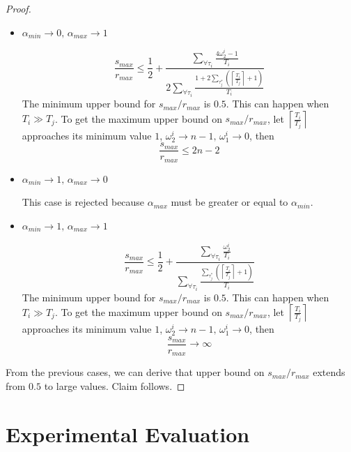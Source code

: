 \begin{proof}
\begin{itemize}
\item $\alpha_{min}\rightarrow0,\,\alpha_{max}\rightarrow1$


\begin{equation}
\frac{s_{max}}{r_{max}}\le\frac{1}{2}+\frac{\sum_{\forall\tau_{i}}\frac{4\omega_{2}^{i}-1}{T_{i}}}{2\sum_{\forall\tau_{i}}\frac{1+2\sum_{\tau_{j}^{*}}\left(\left\lceil \frac{T_{i}}{T_{j}}\right\rceil +1\right)}{T_{i}}}\label{eq:lcm rma lock-free comparison 4}
\end{equation}
The minimum upper bound for $s_{max}/r_{max}$ is $0.5$. This can
happen when $T_{i}\gg T_{j}$. To get the maximum upper bound on $s_{max}/r_{max}$,
let $\left\lceil \frac{T_{i}}{T_{j}}\right\rceil $ approaches its
minimum value $1$, $\omega_{2}^{i}\rightarrow n-1,\,\omega_{1}^{i}\rightarrow0$,
then 
\[
\frac{s_{max}}{r_{max}}\le2n-2
\]


\item $\alpha_{min}\rightarrow1,\,\alpha_{max}\rightarrow0$


This case is rejected because $\alpha_{max}$ must be greater or equal
to $\alpha_{min}$.

\item $\alpha_{min}\rightarrow1,\,\alpha_{max}\rightarrow1$


\begin{equation}
\frac{s_{max}}{r_{max}}\le\frac{1}{2}+\frac{\sum_{\forall\tau_{i}}\frac{\omega_{2}^{i}}{T_{i}}}{\sum_{\forall\tau_{i}}\frac{\sum_{\tau_{j}^{*}}\left(\left\lceil \frac{T_{i}}{T_{j}}\right\rceil +1\right)}{T_{i}}}\label{eq:lcm rma lock-free comparison 5}
\end{equation}
The minimum upper bound for $s_{max}/r_{max}$ is $0.5$. This can
happen when $T_{i}\gg T_{j}$. To get the maximum upper bound on $s_{max}/r_{max}$,
let $\left\lceil \frac{T_{i}}{T_{j}}\right\rceil $ approaches its
minimum value $1$, $\omega_{2}^{i}\rightarrow n-1,\,\omega_{1}^{i}\rightarrow0$,
then 
\[
\frac{s_{max}}{r_{max}}\rightarrow\infty
\]


\end{itemize}
From the previous cases, we can derive that upper bound on $s_{max}/r_{max}$
extends from $0.5$ to large values. Claim follows.

\end{proof}

\section{Experimental Evaluation}\label{exp_eval}

